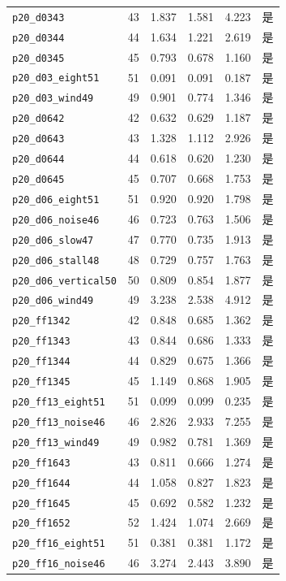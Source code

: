 \documentclass[UTF8,a4paper,11pt,fontset=fandol]{ctexart}
\newcommand{\code}[1]{{\small\nolinkurl{#1}}}
\begin{document}
{\begin{longtable}{L{5.0cm}rrrrL{1.0cm}}
\code{p20_d0343} & 43 & 1.837 & 1.581 & 4.223 & 是\\
\code{p20_d0344} & 44 & 1.634 & 1.221 & 2.619 & 是\\
\code{p20_d0345} & 45 & 0.793 & 0.678 & 1.160 & 是\\
\code{p20_d03_eight51} & 51 & 0.091 & 0.091 & 0.187 & 是\\
\code{p20_d03_wind49} & 49 & 0.901 & 0.774 & 1.346 & 是\\
\code{p20_d0642} & 42 & 0.632 & 0.629 & 1.187 & 是\\
\code{p20_d0643} & 43 & 1.328 & 1.112 & 2.926 & 是\\
\code{p20_d0644} & 44 & 0.618 & 0.620 & 1.230 & 是\\
\code{p20_d0645} & 45 & 0.707 & 0.668 & 1.753 & 是\\
\code{p20_d06_eight51} & 51 & 0.920 & 0.920 & 1.798 & 是\\
\code{p20_d06_noise46} & 46 & 0.723 & 0.763 & 1.506 & 是\\
\code{p20_d06_slow47} & 47 & 0.770 & 0.735 & 1.913 & 是\\
\code{p20_d06_stall48} & 48 & 0.729 & 0.757 & 1.763 & 是\\
\code{p20_d06_vertical50} & 50 & 0.809 & 0.854 & 1.877 & 是\\
\code{p20_d06_wind49} & 49 & 3.238 & 2.538 & 4.912 & 是\\
\code{p20_ff1342} & 42 & 0.848 & 0.685 & 1.362 & 是\\
\code{p20_ff1343} & 43 & 0.844 & 0.686 & 1.333 & 是\\
\code{p20_ff1344} & 44 & 0.829 & 0.675 & 1.366 & 是\\
\code{p20_ff1345} & 45 & 1.149 & 0.868 & 1.905 & 是\\
\code{p20_ff13_eight51} & 51 & 0.099 & 0.099 & 0.235 & 是\\
\code{p20_ff13_noise46} & 46 & 2.826 & 2.933 & 7.255 & 是\\
\code{p20_ff13_wind49} & 49 & 0.982 & 0.781 & 1.369 & 是\\
\code{p20_ff1643} & 43 & 0.811 & 0.666 & 1.274 & 是\\
\code{p20_ff1644} & 44 & 1.058 & 0.827 & 1.823 & 是\\
\code{p20_ff1645} & 45 & 0.692 & 0.582 & 1.232 & 是\\
\code{p20_ff1652} & 52 & 1.424 & 1.074 & 2.669 & 是\\
\code{p20_ff16_eight51} & 51 & 0.381 & 0.381 & 1.172 & 是\\
\code{p20_ff16_noise46} & 46 & 3.274 & 2.443 & 3.890 & 是\\

\end{longtable}}
\end{document}
